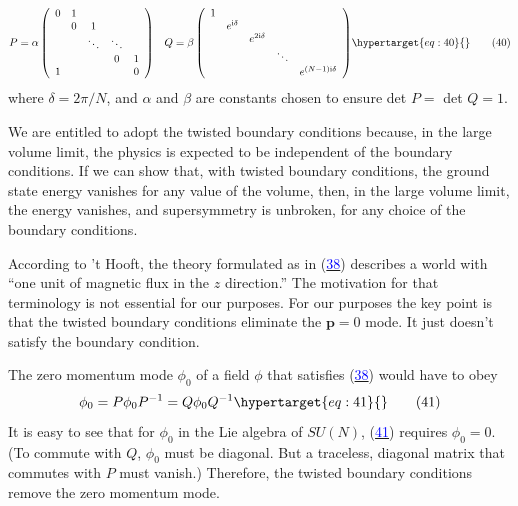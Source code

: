 \documentclass[11pt,a4paper]{article}
\newcommand{\eqtarget}[1]{\hypertarget{eq:#1}{\mathstrut}\tag{#1}}
\newcommand{\eqnref}[1]{(\hyperlink{eq:#1}{\textcolor{blue}{#1}})}
\newcommand{\ii}{\mathrm{i}}
\begin{document}
\begin{equation}
\begin{aligned}
& P = \alpha
\left(
\begin{array}{ccccc}
0 & 1 & & & \\
& 0 & 1 & & \\
& & \ddots & \ddots & \\
& & & 0 & 1 \\
1 & & & & 0
\end{array}
\right)
& Q = \beta
\left(
\begin{array}{ccccc}
1 & & & & \\
& e^{\ii\delta} & & & \\
& & e^{2\ii\delta} & & \\
& & & \ddots & \\
& & & & e^{(N-1)\ii\delta}
\end{array}
\right)
\end{aligned}
\eqtarget{40}
\end{equation}
where $\delta = 2\pi/N$, and $\alpha$ and $\beta$ are constants chosen to ensure det $P =$
det $Q = 1$.

We are entitled to adopt the twisted boundary conditions because,
in the large volume limit, the physics is expected to be
independent of the boundary conditions. If we can show that, with
twisted boundary conditions, the ground state energy vanishes for
any value of the volume, then, in the large volume limit, the energy
vanishes, and supersymmetry is unbroken, for any choice of the
boundary conditions.

According to 't Hooft, the theory formulated as in \eqnref{38} describes
a world with ``one unit of magnetic flux in the $z$ direction.''
The motivation for that terminology is not essential for our purposes.
For our purposes the key point is that the twisted boundary
conditions eliminate the $\mathbf p = 0$ mode. It just doesn't satisfy the
boundary condition.

The zero momentum mode $\phi_0$ of a field $\phi$ that satisfies \eqnref{38}
would have to obey
\begin{equation}
\phi_0 = P \phi_0 P^{-1} = Q \phi_0 Q^{-1}
\eqtarget{41}
\end{equation}
It is easy to see that for $\phi_0$ in the Lie algebra of $SU(N)$, \eqnref{41}
requires $\phi_0 = 0$. (To commute with $Q$, $\phi_0$ must be diagonal. But a
traceless, diagonal matrix that commutes with $P$ must vanish.) Therefore,
the twisted boundary conditions remove the zero momentum mode.
\end{document}
